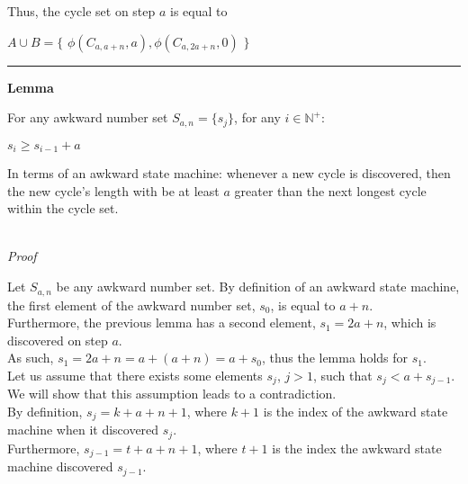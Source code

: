\documentclass[a4paper,12pt]{article}
\begin{document}
\noindent Thus, the cycle set on step $a$ is equal to 
\begin{center}
$A \cup B = \{$ $\phi(C_{a, a + n}, a), \phi(C_{a, 2a + n}, 0)$ $\}$
\end{center}

\begin{center}
\noindent\rule{8cm}{0.4pt}
\end{center}








\label{lemma:min_cycle_length}
\hypertarget{lemma:min_cycle_length}{}
\begin{tcolorbox}
\textbf{Lemma}

For any awkward number set $S_{a,n} = \{s_j\}$, for any $i \in \mathbb{N^+}$:
\begin{center}
$s_i \geq s_{i-1} + a$
\end{center}

In terms of an awkward state machine: whenever a new cycle is discovered, then the new cycle's length with be at least $a$ greater than the next longest cycle within the cycle set.

\end{tcolorbox}

\noindent \\
\textit{Proof}

\noindent Let $S_{a,n}$ be any awkward number set. By definition of an awkward state machine, the first element of the awkward number set, $s_0$, is equal to $a + n$.\\

\noindent Furthermore, the previous lemma has a second element, $s_1 = 2a + n$, which is discovered on step $a$.\\

\noindent As such, $s_1 = 2a + n = a + (a + n) = a + s_0$, thus the lemma holds for $s_1$.\\

\noindent Let us assume that there exists some elements $s_j$, $j > 1$, such that $s_j < a + s_{j-1}$. We will show that this assumption leads to a contradiction.\\

\noindent By definition, $s_j = k + a + n + 1$, where $k + 1$ is the index of the awkward state machine when it discovered $s_j$.\\

\noindent Furthermore, $s_{j-1} = t + a + n + 1$, where $t + 1$ is the index the awkward state machine discovered $s_{j-1}$.\\
\end{document}
